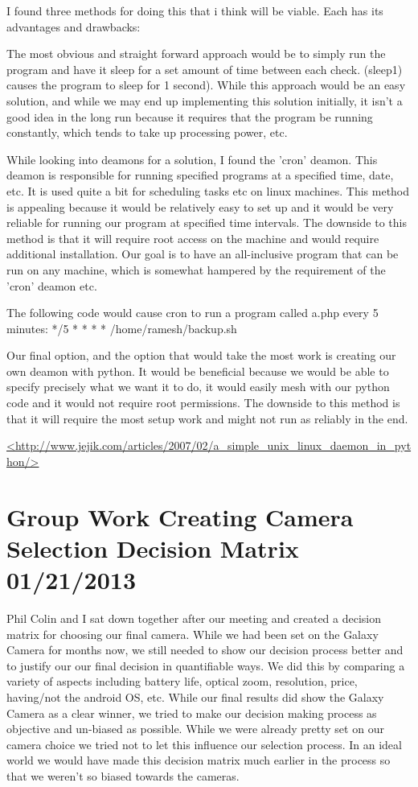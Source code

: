 \documentclass[]{article}
\begin{document}
	I found three methods for doing this that i think will be viable. Each has its advantages and drawbacks:
	
	The most obvious and straight forward approach would be to simply run the program and have it sleep for a set amount of time between each check. (sleep1) causes the program to sleep for 1 second). While this approach would be an easy solution, and while we may end up implementing this solution initially, it isn't a good idea in the long run because it requires that the program be running constantly, which tends to take up processing power, etc.
	
	
	While looking into deamons for a solution, I found the 'cron' deamon. This deamon is responsible for running specified programs at a specified time, date, etc. It is used quite a bit for scheduling tasks etc on linux machines. This method is appealing because it would be relatively easy to set up and it would be very reliable for running our program at specified time intervals. The downside to this method is that it will require root access on the machine and would require additional installation. Our goal is to have an all-inclusive program that can be run on any machine, which is somewhat hampered by the requirement of the 'cron' deamon etc.
	
	The following code would cause cron to run a program called a.php every 5 minutes: */5 * * * * /home/ramesh/backup.sh
	
	Our final option, and the option that would take the most work is creating our own deamon with python. It would be beneficial because we would be able to specify precisely what we want it to do, it would easily mesh with our python code and it would not require root permissions. The downside to this method is that it will require the most setup work and might not run as reliably in the end.
	
	\url{<http://www.jejik.com/articles/2007/02/a_simple_unix_linux_daemon_in_python/>}
	
	\section{Group Work Creating Camera Selection Decision Matrix 01/21/2013}
	
	Phil Colin and I sat down together after our meeting and created a decision matrix for choosing our final camera. While we had been set on the Galaxy Camera for months now, we still needed to show our decision process better and to justify our our final decision in quantifiable ways.	We did this by comparing a variety of aspects including battery life, optical zoom, resolution, price, having/not the android OS, etc. While our final results did show the Galaxy Camera as a clear winner, we tried to make our decision making process as objective and un-biased as possible. While we were already pretty set on our camera choice we tried not to let this influence our selection process. In an ideal world we would have made this decision matrix much earlier in the process so that we weren't so biased towards the cameras. 
	
\end{document}
